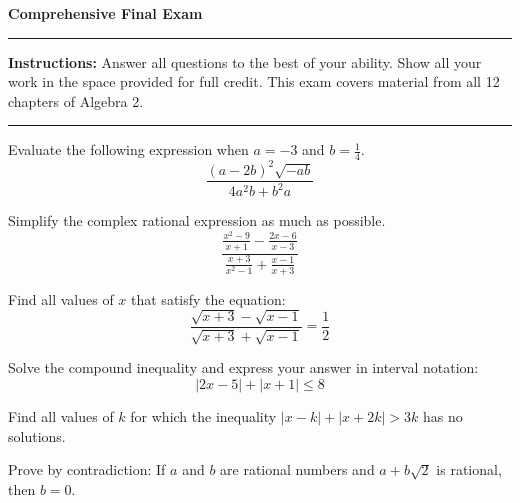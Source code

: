 \documentclass[12pt]{exam}
\newcommand{\examtitle}{Comprehensive Final Exam}
\newcommand{\instructions}{
    \noindent\rule{\textwidth}{0.5pt}
    \begin{center}
    \textbf{Instructions:} Answer all questions to the best of your ability. Show all your work in the space provided for full credit. This exam covers material from all 12 chapters of Algebra 2.
    \end{center}
    \noindent\rule{\textwidth}{0.5pt}
}
\begin{document}
\begin{center}
\textbf{\Large \examtitle} \\
\vspace{0.5cm}
\hspace{0.1\textwidth}
\end{center}

\instructions
\vspace{0.5cm}

\begin{questions}

\pointsinrightmargin


\question[8]
Evaluate the following expression when $a = -3$ and $b = \frac{1}{4}$.
\[ \frac{(a - 2b)^2\sqrt{-ab}}{4a^2b + b^2a} \]
\vspace*{5cm}

\question[7]
Simplify the complex rational expression as much as possible.
\[ \frac{\frac{x^2-9}{x+1} - \frac{2x-6}{x-3}}{\frac{x+3}{x^2-1} + \frac{x-1}{x+3}} \]
\vspace*{6cm}

\question[10]
Find all values of $x$ that satisfy the equation:
\[ \frac{\sqrt{x+3} - \sqrt{x-1}}{\sqrt{x+3} + \sqrt{x-1}} = \frac{1}{2} \]
\vspace*{6cm}


\question[8]
Solve the compound inequality and express your answer in interval notation:
\[ |2x - 5| + |x + 1| \leq 8 \]
\vspace*{6cm}

\question[10]
Find all values of $k$ for which the inequality $|x - k| + |x + 2k| > 3k$ has no solutions.
\vspace*{6cm}

\question[7]
Prove by contradiction: If $a$ and $b$ are rational numbers and $a + b\sqrt{2}$ is rational, then $b = 0$.
\vspace*{6cm}

\newpage



\end{questions}
\end{document}
